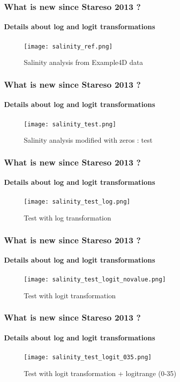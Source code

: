 \begin{frame}
 \frametitle{What is new since Stareso 2013 ?}
 \framesubtitle{Details about log and logit transformations}
 \vspace{-3mm}
 \begin{figure}
 \centering
 \caption{Salinity analysis from Example4D data}
 \vspace{-3mm}
 \texttt{[image: salinity\_ref.png]}
 \end{figure}
\end{frame}
\begin{frame}
 \frametitle{What is new since Stareso 2013 ?}
 \framesubtitle{Details about log and logit transformations}
  \vspace{-3mm}
 \begin{figure}
 \centering
 \caption{Salinity analysis modified with zeros : test}
  \vspace{-3mm}
 \texttt{[image: salinity\_test.png]}
 \end{figure}
\end{frame}
\begin{frame}
 \frametitle{What is new since Stareso 2013 ?}
 \framesubtitle{Details about log and logit transformations}
 \vspace{-3mm}
 \begin{figure}
 \centering
  \caption{Test with log transformation}
   \vspace{-3mm}
 \texttt{[image: salinity\_test\_log.png]}
 \end{figure}
\end{frame}
\begin{frame}
 \frametitle{What is new since Stareso 2013 ?}
 \framesubtitle{Details about log and logit transformations}
   \vspace{-3mm}
 \begin{figure}
 \centering
  \caption{Test with logit transformation}
   \vspace{-3mm}
 \texttt{[image: salinity\_test\_logit\_novalue.png]}
 \end{figure}
\end{frame}
\begin{frame}
 \frametitle{What is new since Stareso 2013 ?}
 \framesubtitle{Details about log and logit transformations}
   \vspace{-3mm}
 \begin{figure}
 \centering
  \caption{Test with logit transformation + logitrange (0-35)}
   \vspace{-3mm}
 \texttt{[image: salinity\_test\_logit\_035.png]}
 \end{figure}
\end{frame}
